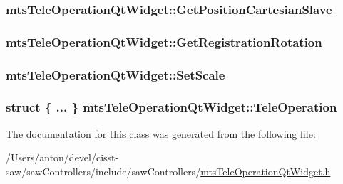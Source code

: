 \subsubsection[{Get\+Position\+Cartesian\+Slave}]{ mts\+Tele\+Operation\+Qt\+Widget\+::\+Get\+Position\+Cartesian\+Slave}\label{classmts_tele_operation_qt_widget_a79f316cb32e00b6562055802ebe7303c}
\hypertarget{classmts_tele_operation_qt_widget_a304765452ec072593f21b09016ef74d2}{}
\subsubsection[{Get\+Registration\+Rotation}]{ mts\+Tele\+Operation\+Qt\+Widget\+::\+Get\+Registration\+Rotation}\label{classmts_tele_operation_qt_widget_a304765452ec072593f21b09016ef74d2}
\hypertarget{classmts_tele_operation_qt_widget_ac2898212c3092185dd4a86dabfc8669e}{}
\subsubsection[{Set\+Scale}]{ mts\+Tele\+Operation\+Qt\+Widget\+::\+Set\+Scale}\label{classmts_tele_operation_qt_widget_ac2898212c3092185dd4a86dabfc8669e}
\hypertarget{classmts_tele_operation_qt_widget_a74e562371df2d0e16754c5f6dbd1a1e5}{}
\subsubsection[{Tele\+Operation}]{\setlength{\rightskip}{0pt plus 5cm}struct \{ ... \}   mts\+Tele\+Operation\+Qt\+Widget\+::\+Tele\+Operation\hspace{0.3cm}{\ttfamily [protected]}}\label{classmts_tele_operation_qt_widget_a74e562371df2d0e16754c5f6dbd1a1e5}


The documentation for this class was generated from the following file\+:\begin{DoxyCompactItemize}
\item 
/\+Users/anton/devel/cisst-\/saw/saw\+Controllers/include/saw\+Controllers/\hyperlink{mts_tele_operation_qt_widget_8h}{mts\+Tele\+Operation\+Qt\+Widget.\+h}\end{DoxyCompactItemize}
